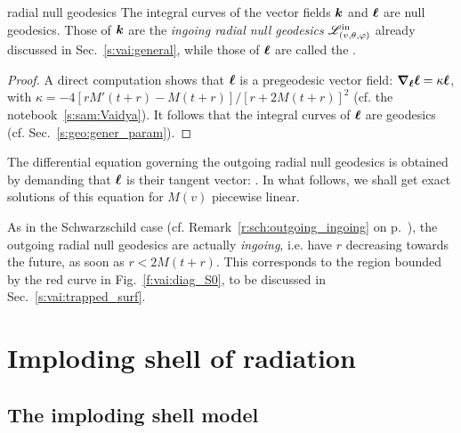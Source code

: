 \begin{tprop}{radial null geodesics}{}
The integral curves of the vector fields $\bm{k}$ and $\bm{\ell}$ are null geodesics.
Those of $\bm{k}$ are the \emph{ingoing radial null geodesics}
$\mathscr{L}^{\rm in}_{(v,\theta,\varphi)}$ already discussed in Sec.~\ref{s:vai:general},
while those of $\bm{\ell}$ are called the .
\end{tprop}

\begin{proof}
A direct computation shows that $\bm{\ell}$ is a pregeodesic vector field:
$\bm{\nabla}_{\bm{\ell}} \bm{\ell} = \kappa \bm{\ell}$, with $\kappa = - 4 [rM'(t+r) - M(t+r)]/[r + 2M(t+r)]^2$
(cf. the notebook~\ref{s:sam:Vaidya}). It follows that the integral curves of
$\bm{\ell}$ are geodesics (cf. Sec.~\ref{s:geo:gener_param}).
\end{proof}
The differential equation governing the outgoing radial null geodesics
is obtained by demanding that $\bm{\ell}$ is their tangent vector:
\be \label{e:vai:ODE_outgoing_null}
    .
\ee
In what follows, we shall get exact solutions of this equation for $M(v)$ piecewise linear.

\begin{remark}
As in the Schwarzschild case (cf. Remark~\ref{r:sch:outgoing_ingoing}
on p.~\pageref{r:sch:outgoing_ingoing}),
the outgoing radial null geodesics are actually \emph{ingoing}, i.e. have $r$ decreasing towards the future,
as soon as $r < 2 M(t+r)$. This corresponds to the region bounded by the red curve in Fig.~\ref{f:vai:diag_S0}, to be discussed in Sec.~\ref{s:vai:trapped_surf}.
\end{remark}


\section{Imploding shell of radiation} \label{s:vai:infall}

\subsection{The imploding shell model} \label{s:vai:imploding_shell}

